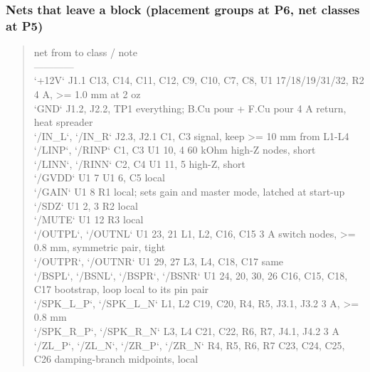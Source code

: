 \documentclass[11pt,a4paper]{article}
\begin{document}
\subsubsection*{Nets that leave a block (placement groups at P6, net classes at P5)}
\begin{quote}\small\ttfamily\raggedright
\textbar{} net \textbar{} from \textbar{} to \textbar{} class / note \textbar{}\\
\textbar{}---\textbar{}---\textbar{}---\textbar{}---\textbar{}\\
\textbar{} `+12V` \textbar{} J1.1 \textbar{} C13, C14, C11, C12, C9, C10, C7, C8, U1 17/18/19/31/32, R2 \textbar{} 4 A, \textgreater{}= 1.0 mm at 2 oz \textbar{}\\
\textbar{} `GND` \textbar{} J1.2, J2.2, TP1 \textbar{} everything; B.Cu pour + F.Cu pour \textbar{} 4 A return, heat spreader \textbar{}\\
\textbar{} `/IN\_L`, `/IN\_R` \textbar{} J2.3, J2.1 \textbar{} C1, C3 \textbar{} signal, keep \textgreater{}= 10 mm from L1-L4 \textbar{}\\
\textbar{} `/LINP`, `/RINP` \textbar{} C1, C3 \textbar{} U1 10, 4 \textbar{} 60 kOhm high-Z nodes, short \textbar{}\\
\textbar{} `/LINN`, `/RINN` \textbar{} C2, C4 \textbar{} U1 11, 5 \textbar{} high-Z, short \textbar{}\\
\textbar{} `/GVDD` \textbar{} U1 7 \textbar{} U1 6, C5 \textbar{} local \textbar{}\\
\textbar{} `/GAIN` \textbar{} U1 8 \textbar{} R1 \textbar{} local; sets gain and master mode, latched at start-up \textbar{}\\
\textbar{} `/SDZ` \textbar{} U1 2, 3 \textbar{} R2 \textbar{} local \textbar{}\\
\textbar{} `/MUTE` \textbar{} U1 12 \textbar{} R3 \textbar{} local \textbar{}\\
\textbar{} `/OUTPL`, `/OUTNL` \textbar{} U1 23, 21 \textbar{} L1, L2, C16, C15 \textbar{} 3 A switch nodes, \textgreater{}= 0.8 mm, symmetric pair, tight \textbar{}\\
\textbar{} `/OUTPR`, `/OUTNR` \textbar{} U1 29, 27 \textbar{} L3, L4, C18, C17 \textbar{} same \textbar{}\\
\textbar{} `/BSPL`, `/BSNL`, `/BSPR`, `/BSNR` \textbar{} U1 24, 20, 30, 26 \textbar{} C16, C15, C18, C17 \textbar{} bootstrap, loop local to its pin pair \textbar{}\\
\textbar{} `/SPK\_L\_P`, `/SPK\_L\_N` \textbar{} L1, L2 \textbar{} C19, C20, R4, R5, J3.1, J3.2 \textbar{} 3 A, \textgreater{}= 0.8 mm \textbar{}\\
\textbar{} `/SPK\_R\_P`, `/SPK\_R\_N` \textbar{} L3, L4 \textbar{} C21, C22, R6, R7, J4.1, J4.2 \textbar{} 3 A \textbar{}\\
\textbar{} `/ZL\_P`, `/ZL\_N`, `/ZR\_P`, `/ZR\_N` \textbar{} R4, R5, R6, R7 \textbar{} C23, C24, C25, C26 \textbar{} damping-branch midpoints, local \textbar{}
\end{quote}
\end{document}
